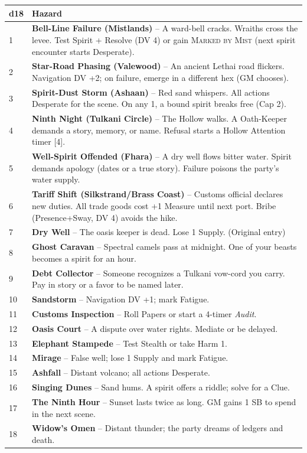 \documentclass[11pt,letterpaper,twoside]{book}
\begin{document}
\begin{longtable}{|p{1.5cm}|p{10cm}|}
\hline
\rowcolor{gray!20}
\textbf{d18} & \textbf{Hazard} \\
\hline
1 & \textbf{Bell-Line Failure (Mistlands)} -- A ward-bell cracks. Wraiths cross the levee. Test Spirit + Resolve (DV 4) or gain \textsc{Marked by Mist} (next spirit encounter starts Desperate). \\
2 & \textbf{Star-Road Phasing (Valewood)} -- An ancient Lethai road flickers. Navigation DV +2; on failure, emerge in a different hex (GM chooses). \\
3 & \textbf{Spirit-Dust Storm (Ashaan)} -- Red sand whispers. All actions Desperate for the scene. On any 1, a bound spirit breaks free (Cap 2). \\
4 & \textbf{Ninth Night (Tulkani Circle)} -- The Hollow walks. A Oath-Keeper demands a story, memory, or name. Refusal starts a Hollow Attention timer [4]. \\
5 & \textbf{Well-Spirit Offended (Fhara)} -- A dry well flows bitter water. Spirit demands apology (dates or a true story). Failure poisons the party's water supply. \\
6 & \textbf{Tariff Shift (Silkstrand/Brass Coast)} -- Customs official declares new duties. All trade goods cost +1 Measure until next port. Bribe (Presence+Sway, DV 4) avoids the hike. \\
7 & \textbf{Dry Well} -- The oasis keeper is dead. Lose 1 Supply. (Original entry) \\
8 & \textbf{Ghost Caravan} -- Spectral camels pass at midnight. One of your beasts becomes a spirit for an hour. \\
9 & \textbf{Debt Collector} -- Someone recognizes a Tulkani vow-cord you carry. Pay in story or a favor to be named later. \\
10 & \textbf{Sandstorm} -- Navigation DV +1; mark Fatigue. \\
11 & \textbf{Customs Inspection} -- Roll Papers or start a 4-timer \emph{Audit}. \\
12 & \textbf{Oasis Court} -- A dispute over water rights. Mediate or be delayed. \\
13 & \textbf{Elephant Stampede} -- Test Stealth or take Harm 1. \\
14 & \textbf{Mirage} -- False well; lose 1 Supply and mark Fatigue. \\
15 & \textbf{Ashfall} -- Distant volcano; all actions Desperate. \\
16 & \textbf{Singing Dunes} -- Sand hums. A spirit offers a riddle; solve for a Clue. \\
17 & \textbf{The Ninth Hour} -- Sunset lasts twice as long. GM gains 1 SB to spend in the next scene. \\
18 & \textbf{Widow's Omen} -- Distant thunder; the party dreams of ledgers and death. \\
\hline
\end{longtable}
\end{document}
